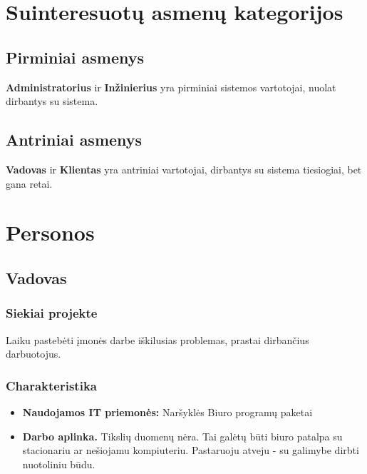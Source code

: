 \section{Suinteresuotų asmenų kategorijos}

	\subsection{Pirminiai asmenys}
	
	\textbf{Administratorius} ir \textbf{Inžinierius} yra pirminiai sistemos vartotojai, nuolat dirbantys su sistema.
	
	\subsection{Antriniai asmenys}
	
	\textbf{Vadovas} ir \textbf{Klientas} yra antriniai vartotojai, dirbantys su sistema tiesiogiai, bet gana retai.

\section{Personos}

	\subsection{Vadovas}
		
		\subsubsection{Siekiai projekte}
		
		Laiku pastebėti įmonės darbe iškilusias problemas, prastai dirbančius darbuotojus.
		
		\subsubsection{Charakteristika}
		
		\begin{itemize}
			\item \textbf{Naudojamos IT priemonės:}
				\subitem Naršyklės
				\subitem Biuro programų paketai
			\item \textbf{Darbo aplinka.} Tikslių duomenų nėra. 
			Tai galėtų būti biuro patalpa su stacionariu ar nešiojamu kompiuteriu.
			Pastaruoju atveju - su galimybe dirbti nuotoliniu būdu.
		\end{itemize}
			
